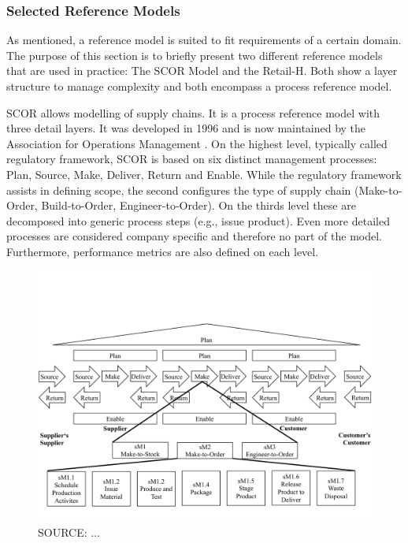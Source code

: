 		
		\subsubsection{Selected Reference Models}
		
		As mentioned, a reference model is suited to fit requirements of a certain domain. The purpose of this section is to briefly present two different reference models that are used in practice: The \acrfull{SCOR} Model and the Retail-H. Both show a layer structure to manage complexity and both encompass a process reference model. 
		
		\acrshort{SCOR} allows modelling of supply chains. It is a process reference model with three detail layers. It was developed in 1996 and is now maintained by the Association for Operations Management \citep{APICS2015}. On the highest level, typically called regulatory framework, \acrshort{SCOR}  is based on six distinct management processes: Plan, Source, Make, Deliver, Return and Enable. While the regulatory framework assists in defining scope, the second configures the type of supply chain (Make-to-Order, Build-to-Order, Engineer-to-Order). On the thirds level these are decomposed into generic process steps (e.g., issue product). Even more detailed processes are considered company specific and therefore no part of the model. Furthermore, performance metrics are also defined on each level. 

		\begin{figure}[caption={SCOR Model}, label={fig:scor}]
		{	\includegraphics[width=.8\textwidth]{figures/scor.pdf}}
			\hspace{6.2cm}	SOURCE: ...
		\end{figure}
	

